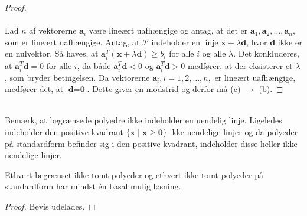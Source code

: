 \begin{proof}
\\\\
%
Lad $n$ af vektorerne $\textbf{a}_i$ være lineært uafhængige og antag, at det er $\textbf{a}_1, \textbf{a}_2, \ldots , \textbf{a}_n$, som er lineært uafhængige.
Antag, at $\mathcal{P}$ indeholder en linje $\textbf{x} + \lambda \textbf{d}$, hvor $\textbf{d}$ ikke er en nulvektor.
Så haves, at $\textbf{a}_i^T (\textbf{x} + \lambda \textbf{d}) \geq b_i$ for alle $i$ og alle $\lambda$.
Det konkluderes, at $\textbf{a}_i^T \textbf{d} = 0$ for alle $i$, da både  $\textbf{a}_i^T \textbf{d} < 0$ og  $\textbf{a}_i^T \textbf{d} > 0$ medfører, at der eksisterer et $\lambda$, som bryder betingelsen.
Da vektorerne $\textbf{a}_i, i = 1, 2, \ldots, n,$ er lineært uafhængige, medfører det, at $\textbf{d}=\textbf{0}$.
Dette giver en modstrid og derfor må (c) $\rightarrow$ (b).
\end{proof}\\
%
Bemærk, at begrænsede polyedre ikke indeholder en uendelig linje.
Ligeledes indeholder den positive kvadrant $\{ \textbf{x} \mid \textbf{x} \geq \textbf{0}\}$ ikke uendelige linjer og da polyeder på standardform befinder sig i den positive kvadrant, indeholder disse heller ikke uendelige linjer.
%
\begin{kor}{}{}
Ethvert begrænset ikke-tomt polyeder og ethvert ikke-tomt polyeder på standardform har mindst én basal mulig løsning.
\end{kor}
%
\begin{proof}
Bevis udelades.
\end{proof}